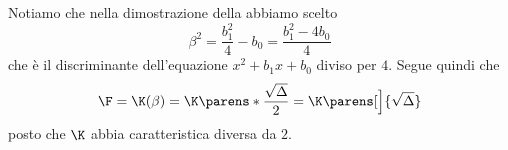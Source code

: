 \begin{remark} \label{rem:quad_ext=>sqrt_discr}
    Notiamo che nella dimostrazione della  abbiamo scelto \[
        \beta^2 = \frac{b_1^2}{4} - b_0 = \frac{b_1^2 - 4b_0}{4}
    \] che è il discriminante dell'equazione $x^2 + b_1x + b_0$ diviso per $4$. Segue quindi che \[
        \F = \K(\beta) = \K\parens*{\frac{\sqrt{\Delta}}{2}} = \K\parens[\Big]{\sqrt{\Delta}}
    \] posto che $\K$ abbia caratteristica diversa da $2$. 
\end{remark}
